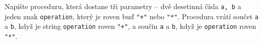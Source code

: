 \question[50]
Napište proceduru, která dostane tři parametry -- dvě desetinná čísla \texttt{a,
	b} a jeden znak \texttt{operation}, který je roven buď \texttt{"+"} nebo
\texttt{"*"}. Procedura vrátí součet \texttt{a} a \texttt{b}, když je
string \texttt{operation} roven \texttt{"+"}, a součin \texttt{a} a
\texttt{b}, když je \texttt{operation} roven \texttt{"*"}.